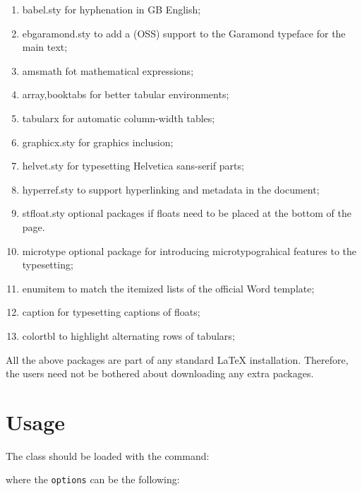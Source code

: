 \documentclass[10pt,onecolumn]{imeko_acta}
\def\file#1{\textsf{\fontsize{9.1}{9.5}\selectfont#1}\xspace}
\begin{document}
\begin{enumerate}
	\item \file{babel.sty} for hyphenation in GB English;
	\item \file{ebgaramond.sty} to add a (OSS) support to the Garamond typeface for the main text;
	\item \file{amsmath} fot mathematical expressions;
	\item \file{array,booktabs} for better tabular environments;
	\item \file{tabularx} for automatic column-width tables;
	\item \file{graphicx.sty} for graphics inclusion;
	\item \file{helvet.sty} for typesetting Helvetica sans-serif parts;
	\item \file{hyperref.sty} to support hyperlinking and metadata in the document;
	\item \file{stfloat.sty} optional packages if floats need to be placed at
	the bottom of the page.
	\item \file{microtype} optional package for introducing microtypograhical features to the typesetting;
	\item \file{enumitem} to match the itemized lists of the official Word template;
	\item \file{caption} for typesetting captions of floats;
	\item \file{colortbl} to highlight alternating rows of tabulars;
\end{enumerate}

All the above packages are part of any
standard \LaTeX{} installation. Therefore, the users need not be
bothered about downloading any extra packages.

\section{Usage}\label{sec:usage}
The class should be loaded with the command:
\medskip


\medskip\noindent where the \verb+options+ can be the following:
\end{document}
